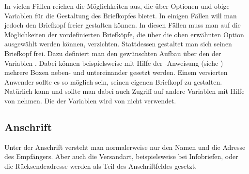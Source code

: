 \begin{Declaration}
\end{Declaration}
In vielen Fällen reichen die Möglichkeiten aus, die  über
Optionen und obige Variablen für die Gestaltung des Briefkopfes bietet. In
einigen Fällen will man jedoch den Briefkopf freier gestalten können. In
diesen Fällen muss man auf die Möglichkeiten der vordefinierten Briefköpfe,
die über die oben erwähnten Option ausgewählt werden können,
verzichten. Stattdessen gestaltet man sich seinen Briefkopf frei. Dazu
definiert man den gewünschten Aufbau über den  der Variablen
. Dabei können beispielsweise mit Hilfe der
-Anweisung (siehe \cite{latex:usrguide-historic}) mehrere Boxen
neben- und untereinander gesetzt werden.  Einem versierten Anwender sollte es
so möglich sein, seinen eigenen Briefkopf zu gestalten. Natürlich kann und
sollte man dabei auch Zugriff auf andere Variablen mit Hilfe von
 nehmen. Die  der
Variablen  wird von \KOMAScript{} nicht verwendet.
%
  \EndIndexGroup
%
\EndIndexGroup


\subsection{Anschrift}
%
\BeginIndexGroup
{}%

Unter der Anschrift versteht man normalerweise nur den Namen und die Adresse
des Empfängers. %
\iffalse%
Als \iffree{erste }{}Erweiterung zur Anschrift kann die
Versandart betrachtet werden, die etwa bei \iffree{Einschreiben oder
}{}Infobriefen zur Anwendung kommt. Bei Fensterbriefumschlägen wird auch die
sogenannte Rücksendeadresse \iffree{zur Anschrift}{dazu} gezählt, da sie im
Anschriftfenster zu sehen \iffree{sein wird}{ist}. Die Anschrift folgt
unmittelbar auf den Briefkopf.%
\else%
Aber auch die Versandart, beispielsweise bei Infobriefen, oder die
Rücksendeadresse werden als Teil des Anschriftfeldes gesetzt.%
\fi


